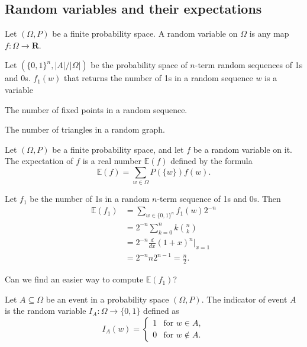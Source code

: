 \subsection{Random variables and their expectations}
\begin{definition}
Let $(\Omega,P)$ be a finite probability space. A random variable on $\Omega$ is any map $f:\Omega \to \mathbf{R}$.
\end{definition}
\begin{example}
Let $(\{ 0,1 \}^{n},|A|/|\Omega|)$ be the probability space of $n$-term random sequences of 1s and 0s. $f_{1}(w)$ that returns the number of 1s in a random sequence $w$ is a variable
\end{example}
\begin{example}
The number of fixed points in a random sequence.
\end{example}
\begin{example}
The number of triangles in a random graph.
\end{example}
\begin{definition}
Let $(\Omega,P)$ be a finite probability space, and let $f$ be a random variable on it. The expectation of $f$ is a real number $\mathbb{E}(f)$ defined by the formula
$$
\mathbb{E}(f)=\sum _{w\in \Omega}P(\{w \})f(w).
$$
\end{definition}
\begin{example}\label{noones}
Let $f_{1}$ be the number of 1s in a random $n$-term sequence of 1s and 0s. Then
\begin{align*}
\mathbb{E}(f_{1}) & =\sum _{w\in \{ 0,1 \}^{n}}f_{1}(w)2^{-n} \\
 & =2^{-n}\sum_{k=0}^{n} k\binom{ n}  {k }   \\
 & =2^{-n} \frac{d}{dx}(1+x)^{n}|_{x=1} \\
 &=2^{-n}n 2^{n-1}=\frac{n}{2}.
\end{align*}
\end{example}
\begin{question}
Can we find an easier way to compute $\mathbb{E}(f_{1})$?
\end{question}
\begin{definition}
Let $A\subseteq \Omega$ be an event in a probability space $(\Omega,P)$. The indicator of event $A$ is the random variable $I_{A}:\Omega \to \{ 0,1 \}$ defined as
$$
I_{A}(w)=\begin{cases}
1 & \text{for }w\in A, \\
0 & \text{for }w\not\in A.
\end{cases}
$$
\end{definition}
